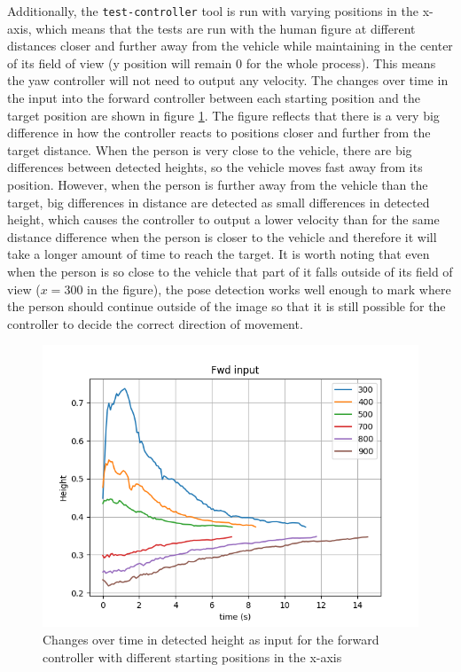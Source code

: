 Additionally, the \texttt{test-controller} tool is run with varying positions in the x-axis, which means that the tests are run with the human figure at different distances closer and further away from the vehicle while maintaining in the center of its field of view (y position will remain 0 for the whole process).
This means the yaw controller will not need to output any velocity.
The changes over time in the input into the forward controller between each starting position and the target position are shown in figure \ref{fig:validate-fwd}.
The figure reflects that there is a very big difference in how the controller reacts to positions closer and further from the target distance.
When the person is very close to the vehicle, there are big differences between detected heights, so the vehicle moves fast away from its position.
However, when the person is further away from the vehicle than the target, big differences in distance are detected as small differences in detected height, which causes the controller to output a lower velocity than for the same distance difference when the person is closer to the vehicle and therefore it will take a longer amount of time to reach the target.
It is worth noting that even when the person is so close to the vehicle that part of it falls outside of its field of view ($x=300$ in the figure), the pose detection works well enough to mark where the person should continue outside of the image so that it is still possible for the controller to decide the correct direction of movement.

\begin{figure}
  \centering
  \includegraphics[width=.8\textwidth, keepaspectratio]{img/pid/validation_fwd.png}
  \caption{Changes over time in detected height as input for the forward controller with different starting positions in the x-axis}
  \label{fig:validate-fwd}
\end{figure}


\clearpage




\clearpage